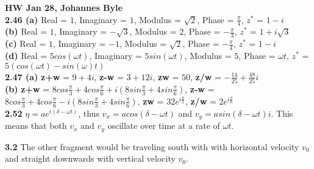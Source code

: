 \documentclass[english]{article}
\begin{document}
\textbf{HW Jan 28, Johannes Byle}\\

\noindent
\textbf{2.46 (a)} Real = $1$, Imaginary = $1$, Modulus = $\sqrt{2}$, Phase = $\frac{\pi}{4}$, $z^*$ = $1-i$\\

\textbf{(b)} Real = $1$, Imaginary = $-\sqrt{3}$, Modulus = $2$, Phase = $-\frac{\pi}{3}$, $z^*$ = $1+i\sqrt{3}$\\ 

\textbf{(c)} Real = $1$, Imaginary = $-1$, Modulus = $\sqrt{2}$, Phase = $-\frac{\pi}{4}$, $z^*$ = $1-i$\\

\textbf{(d)} Real = $5cos(\omega t)$, Imaginary = $5sin(\omega t)$, Modulus = $5$, Phase = $\omega t$, $z^*$ = $5(cos(\omega t)-sin(\omega)t)$\\

\noindent
\textbf{2.47 (a)} \textbf{z+w} = $9+4i$, \textbf{z-w} = $3+12i$, \textbf{zw} = $50$, \textbf{z/w} = $-\frac{14}{25}+\frac{48}{25}i$\\

\textbf{(b)} \textbf{z+w} = $8cos\frac{\pi}{3}+4cos\frac{\pi}{6}+i(8sin\frac{\pi}{3}+4sin\frac{\pi}{6})$, \textbf{z-w} = $8cos\frac{\pi}{3}+4cos\frac{\pi}{6}-i(8sin\frac{\pi}{3}+4sin\frac{\pi}{6})$, \textbf{zw} = $32e^{i\frac{\pi}{2}}$, \textbf{z/w} = $2e^{i\frac{\pi}{6}}$\\

\noindent
\textbf{2.52} $\eta=ae^{i(\delta-\omega t)}$, thus $v_x=acos(\delta-\omega t)$ and  $v_y=asin(\delta-\omega t)i$. This means that both $v_x$ and $v_y$ oscillate over time at a rate of $\omega t$.

\noindent
\textbf{3.2} The other fragment would be traveling south with with horizontal velocity $v_0$ and straight downwards with vertical velocity $v_0$.
\end{document}
